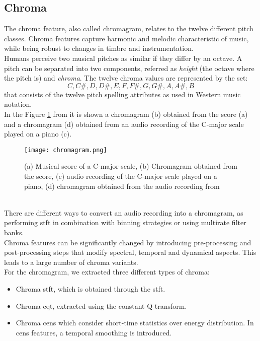 \subsection{Chroma}
The chroma feature, also called chromagram, relates to the twelve different pitch classes. Chroma features capture harmonic and melodic characteristic of music, while being robust to changes in timbre and instrumentation.
\\
Humans perceive two musical pitches as similar if they differ by an octave. A pitch can be separated into two components, referred as \textit{height} (the octave where the pitch is) and \textit{chroma}. The twelve chroma values are represented by the set:
\[{C, C\#, D, D\#, E , F, F\#, G, G\#, A, A\#, B}\]
that consists of the twelve pitch spelling attributes as used in Western music notation.
\\
In the Figure \ref{fig:chromagram} from \cite{inproceedings} it is shown a chromagram (b) obtained from the score (a) and a chromagram (d) obtained from an audio recording of the C-major scale played on a piano (c).
\begin{figure}[h]
    \centering
    \texttt{[image: chromagram.png]} 
	\caption{(a) Musical score of a C-major scale, (b) Chromagram obtained from the score, (c) audio recording of the C-major scale played on a piano, (d) chromagram obtained from the audio recording from \cite{inproceedings}}
    \label{fig:chromagram}
\end{figure}
\\
There are different ways to convert an audio recording into a chromagram, as performing \gls{stft} in combination with binning strategies or using multirate filter banks.
\\ \indent
Chroma features can be significantly changed by introducing pre-processing and post-processing steps that modify spectral, temporal and dynamical aspects. This leads to a large number of chroma variants.
\\
For the chromagram, we extracted three different types of chroma:
\begin{itemize}
	\item Chroma \gls{stft}, which is obtained through the \gls{stft}.
	\item Chroma cqt, extracted using the constant-Q transform.
	\item Chroma cens which consider short-time statistics over energy distribution. In \gls{cens} features, a temporal smoothing is introduced.
\end{itemize}
